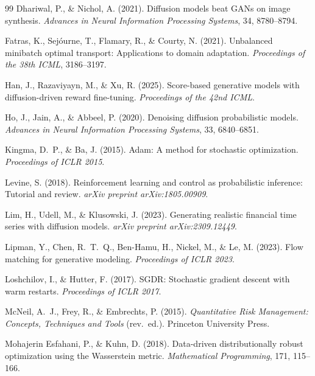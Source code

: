 \documentclass{article}
\begin{document}
\begin{thebibliography}{99}
Dhariwal, P., \& Nichol, A. (2021).
\newblock Diffusion models beat GANs on image synthesis.
\newblock \emph{Advances in Neural Information Processing Systems}, 34,
  8780--8794.

Fatras, K., Sej\'{o}urne, T., Flamary, R., \& Courty, N. (2021).
\newblock Unbalanced minibatch optimal transport: Applications to domain
  adaptation.
\newblock \emph{Proceedings of the 38th ICML}, 3186--3197.

Han, J., Razaviyayn, M., \& Xu, R. (2025).
\newblock Score-based generative models with diffusion-driven reward
  fine-tuning.
\newblock \emph{Proceedings of the 42nd ICML}.

Ho, J., Jain, A., \& Abbeel, P. (2020).
\newblock Denoising diffusion probabilistic models.
\newblock \emph{Advances in Neural Information Processing Systems}, 33,
  6840--6851.

Kingma, D.~P., \& Ba, J. (2015).
\newblock Adam: A method for stochastic optimization.
\newblock \emph{Proceedings of ICLR 2015}.

Levine, S. (2018).
\newblock Reinforcement learning and control as probabilistic inference:
  Tutorial and review.
\newblock \emph{arXiv preprint arXiv:1805.00909}.

Lim, H., Udell, M., \& Klusowski, J. (2023).
\newblock Generating realistic financial time series with diffusion models.
\newblock \emph{arXiv preprint arXiv:2309.12449}.

Lipman, Y., Chen, R.~T.~Q., Ben-Hamu, H., Nickel, M., \& Le, M. (2023).
\newblock Flow matching for generative modeling.
\newblock \emph{Proceedings of ICLR 2023}.

Loshchilov, I., \& Hutter, F. (2017).
\newblock SGDR: Stochastic gradient descent with warm restarts.
\newblock \emph{Proceedings of ICLR 2017}.

McNeil, A.~J., Frey, R., \& Embrechts, P. (2015).
\newblock \emph{Quantitative Risk Management: Concepts, Techniques and Tools}
  (rev.\ ed.).
\newblock Princeton University Press.

Mohajerin Esfahani, P., \& Kuhn, D. (2018).
\newblock Data-driven distributionally robust optimization using the Wasserstein
  metric.
\newblock \emph{Mathematical Programming}, 171, 115--166.


\end{thebibliography}
\end{document}
